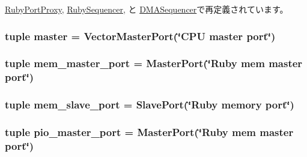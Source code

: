\hyperlink{classSequencer_1_1RubyPortProxy_a17da7064bc5c518791f0c891eff05fda}{RubyPortProxy}, \hyperlink{classSequencer_1_1RubySequencer_a17da7064bc5c518791f0c891eff05fda}{RubySequencer}, と \hyperlink{classSequencer_1_1DMASequencer_a17da7064bc5c518791f0c891eff05fda}{DMASequencer}で再定義されています。\hypertarget{classSequencer_1_1RubyPort_a0f74d64e6817f0f89bafc52ff3c56cbb}{
\subsubsection[{master}]{\setlength{\rightskip}{0pt plus 5cm}tuple {\bf master} = VectorMasterPort(\char`\"{}CPU {\bf master} port\char`\"{})}}
\label{classSequencer_1_1RubyPort_a0f74d64e6817f0f89bafc52ff3c56cbb}
\hypertarget{classSequencer_1_1RubyPort_a2dd7c1b9852261e71c99dba4668ebcf8}{
\subsubsection[{mem\_\-master\_\-port}]{\setlength{\rightskip}{0pt plus 5cm}tuple {\bf mem\_\-master\_\-port} = {\bf MasterPort}(\char`\"{}Ruby mem {\bf master} port\char`\"{})}}
\label{classSequencer_1_1RubyPort_a2dd7c1b9852261e71c99dba4668ebcf8}
\hypertarget{classSequencer_1_1RubyPort_af0bfd7c0d08a39ab402b0542b759f474}{
\subsubsection[{mem\_\-slave\_\-port}]{\setlength{\rightskip}{0pt plus 5cm}tuple {\bf mem\_\-slave\_\-port} = {\bf SlavePort}(\char`\"{}Ruby memory port\char`\"{})}}
\label{classSequencer_1_1RubyPort_af0bfd7c0d08a39ab402b0542b759f474}
\hypertarget{classSequencer_1_1RubyPort_a63d83b93705d8e98024b0cf901f52f75}{
\subsubsection[{pio\_\-master\_\-port}]{\setlength{\rightskip}{0pt plus 5cm}tuple {\bf pio\_\-master\_\-port} = {\bf MasterPort}(\char`\"{}Ruby mem {\bf master} port\char`\"{})}}
